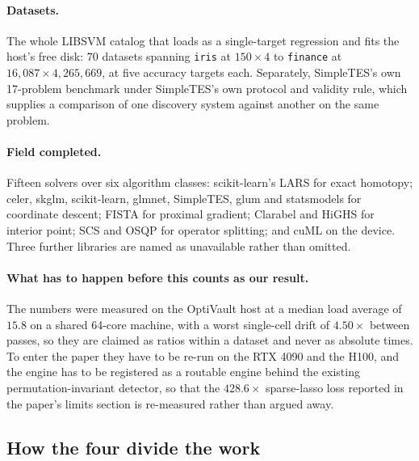 \documentclass[11pt]{article}
\begin{document}
\paragraph{Datasets.} The whole LIBSVM catalog that loads as a single-target
regression and fits the host's free disk: 70 datasets spanning
\texttt{iris} at $150 \times 4$ to \texttt{finance} at
$16{,}087 \times 4{,}265{,}669$, at five accuracy targets each. Separately,
SimpleTES's own 17-problem benchmark under SimpleTES's own protocol and validity
rule, which supplies a comparison of one discovery system against another on the
same problem.

\paragraph{Field completed.} Fifteen solvers over six algorithm classes:
scikit-learn's LARS for exact homotopy; celer, skglm, scikit-learn, glmnet,
SimpleTES, glum and statsmodels for coordinate descent; FISTA for proximal
gradient; Clarabel and HiGHS for interior point; SCS and OSQP for operator
splitting; and cuML on the device. Three further libraries are named as
unavailable rather than omitted.

\paragraph{What has to happen before this counts as our result.} The numbers
were measured on the OptiVault host at a median load average of $15.8$ on a
shared 64-core machine, with a worst single-cell drift of $4.50\times$ between
passes, so they are claimed as ratios within a dataset and never as absolute
times. To enter the paper they have to be re-run on the RTX 4090 and the H100,
and the engine has to be registered as a routable engine behind the existing
permutation-invariant detector, so that the $428.6\times$ sparse-lasso loss
reported in the paper's limits section is re-measured rather than argued away.

\subsection{How the four divide the work}
\end{document}
